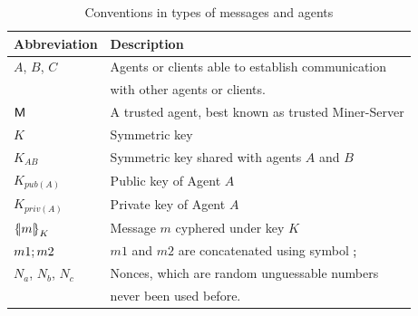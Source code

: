 \begin{table}[htb]
\footnotesize
\begin{center}
\caption{Conventions in types of messages and agents}
\label{table:conventions}
\begin{tabular}{|l|l|}
\hline
{\bf Abbreviation}& {\bf Description}                                   \\\hline\hline
$A$, $B$, $C$       &  Agents or clients able to establish communication  \\
                    &  with other agents or clients.                      \\ 
$\textsf{M}$           &  A trusted agent, best known as trusted Miner-Server      \\
$K$                 &  Symmetric key                                      \\
$K_{AB}$            &  Symmetric key shared with agents $A$ and $B$       \\
$K_{pub(A)}$        &  Public key of Agent $A$                            \\
$K_{priv(A)}$       &  Private key of Agent $A$                           \\
$\fat{m}_{K}$       &  Message $m$ cyphered under key $K$                 \\
$m1; m2$         &  $m1$ and $m2$ are concatenated using symbol $;$ \\
$N_a$, $N_b$, $N_c$ &  Nonces, which are random unguessable numbers      \\
                    &  never been used before.                           \\ \hline \hline
\end{tabular}
\end{center}
\end{table}
\normalsize

